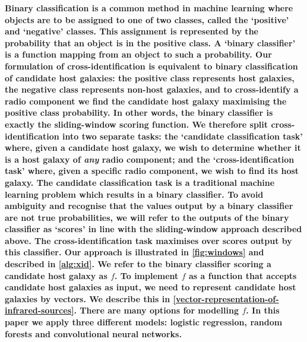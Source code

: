 \documentclass[fleqn,usenatbib,usedcolumn]{mnras}
\newcommand{\edited}[1]{{\bf {#1}}}
\begin{document}
    \edited{Binary classification is a common method in machine learning
    where objects are to be assigned to one of two classes,
    called the `positive' and `negative' classes. This assignment is
    represented by the probability that an object is in the positive class. A
    `binary classifier' is a function mapping from an object to such a
    probability. Our formulation of cross-identification is equivalent to
    binary classification of candidate host galaxies: the positive class
    represents host galaxies, the negative class represents non-host galaxies,
    and to cross-identify a radio component we find the candidate host galaxy
    maximising the positive class probability. In other words,
    the binary classifier is exactly the sliding-window scoring function. We therefore split
    cross-identification into two separate tasks: the `candidate
    classification task' where, given a candidate host galaxy, we wish to
    determine whether it is a host galaxy of \emph{any} radio component; and
    the `cross-identification task' where, given a specific radio
    component, we wish to find its host galaxy. The candidate classification task
    is a traditional machine learning problem which results in a binary
    classifier. To avoid ambiguity and recognise that the values output by a
    binary classifier are not true probabilities, we will refer to the outputs
    of the binary classifier as `scores' in line with the sliding-window approach
    described above. The cross-identification task maximises over scores
    output by this classifier. Our approach is illustrated in
    \autoref{fig:windows} and described in \autoref{alg:xid}. We refer to the
    binary classifier scoring a candidate host galaxy as
    $f$. To implement $f$ as a function that accepts candidate host galaxies
    as input, we need to represent candidate host galaxies by vectors. We
    describe this in \autoref{vector-representation-of-infrared-sources}.
    There are many options for modelling $f$. In this paper we apply three
    different models: logistic regression, random forests and convolutional
    neural networks.}
\end{document}
